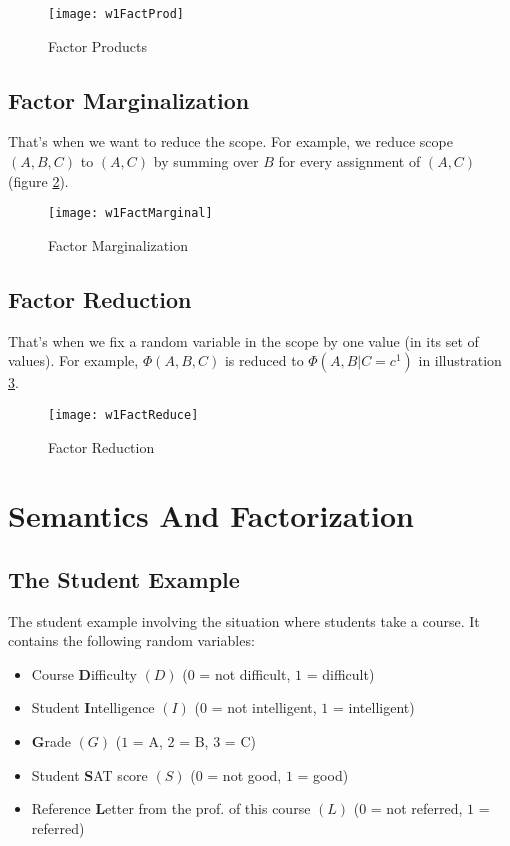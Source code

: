 \begin{figure}[!ht]
\centering
\texttt{[image: w1FactProd]}
\caption{Factor Products}
\label{w1FactProd}
\end{figure}

\subsection{Factor Marginalization}
That's when we want to reduce the scope. For example, we reduce scope $(A,B,C)$ to $(A,C)$ by summing over $B$ for every assignment of $(A,C)$ (figure \ref{w1FactMarginal}).

\begin{figure}[!ht]
\centering
\texttt{[image: w1FactMarginal]}
\caption{Factor Marginalization}
\label{w1FactMarginal}
\end{figure}

\subsection{Factor Reduction}
That's when we fix a random variable in the scope by one value (in its set of values). For example, $\Phi(A,B,C)$ is reduced to $\Phi(A,B | C = c^1)$ in illustration \ref{w1FactReduce}.
\begin{figure}[!ht]
\centering
\texttt{[image: w1FactReduce]}
\caption{Factor Reduction}
\label{w1FactReduce}
\end{figure}

\section{Semantics And Factorization}
\subsection{The Student Example}
The student example involving the situation where students take a course. It contains the following random variables:
\begin{itemize}
	\item Course \textbf{D}ifficulty $(D)$ ($0$ = not difficult, $1$ = difficult)
	\item Student \textbf{I}ntelligence $(I)$ ($0$ = not intelligent, $1$ = intelligent)
	\item \textbf{G}rade $(G)$ ($1$ = A, $2$ = B, $3$ = C)
	\item Student \textbf{S}AT score $(S)$ ($0$ = not good, $1$ = good)
	\item Reference \textbf{L}etter from the prof. of this course $(L)$ ($0$ = not referred, $1$ = referred)
\end{itemize}


